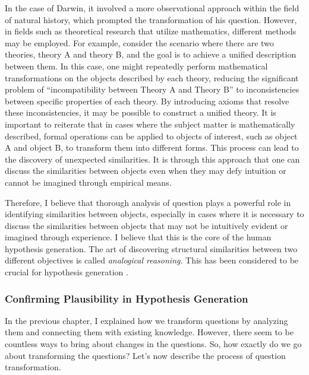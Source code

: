 \documentclass{article}
\begin{document}
In the case of Darwin, it involved a more observational approach within the field of natural history, which prompted the transformation of his question. However, in fields such as theoretical research that utilize mathematics, different methods may be employed. For example, consider the scenario where there are two theories, theory A and theory B, and the goal is to achieve a unified description between them. In this case, one might repeatedly perform mathematical transformations on the objects described by each theory, reducing the significant problem of ``incompatibility between Theory A and Theory B'' to inconsistencies between specific properties of each theory. By introducing axioms that resolve these inconsistencies, it may be possible to construct a unified theory. It is important to reiterate that in cases where the subject matter is mathematically described, formal operations can be applied to objects of interest, such as object A and object B, to transform them into different forms. This process can lead to the discovery of unexpected similarities. It is through this approach that one can discuss the similarities between objects even when they may defy intuition or cannot be imagined through empirical means. 

Therefore, I believe that thorough analysis of question plays a powerful role in identifying similarities between objects, especially in cases where it is necessary to discuss the similarities between objects that may not be intuitively evident or imagined through experience. I believe that this is the core of the human hypothesis generation. The art of discovering structural similarities between two different objectives is called \textit{analogical reasoning}. This has been considered to be crucial for hypothesis generation \cite{hesse1965models,thagard_1984,gentner1993shift,holyoak1996mental,dunbar1997scientists,gentner2002analogy}. 

\subsubsection{Confirming Plausibility in Hypothesis Generation}

In the previous chapter, I explained how we transform questions by analyzing them and connecting them with existing knowledge. However, there seem to be countless ways to bring about changes in the questions. So, how exactly do we go about transforming the questions? Let's now describe the process of question transformation.

\end{document}
